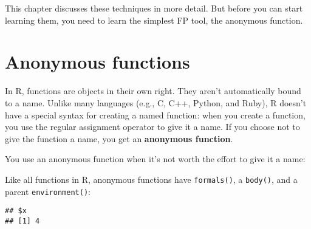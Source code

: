 This chapter discusses these techniques in more detail. But before you
can start learning them, you need to learn the simplest FP tool, the
anonymous function.

\hypertarget{anonymous-functions}{%
\section{Anonymous functions}\label{anonymous-functions}}

In R, functions are objects in their own right. They aren't
automatically bound to a name. Unlike many languages (e.g., C, C++,
Python, and Ruby), R doesn't have a special syntax for creating a named
function: when you create a function, you use the regular assignment
operator to give it a name. If you choose not to give the function a
name, you get an \textbf{anonymous function}.
 

You use an anonymous function when it's not worth the effort to give it
a name:

\begin{Shaded}
\begin{Highlighting}[]
\NormalTok{(}
\NormalTok{(}\OperatorTok{!}
\NormalTok{(}\OperatorTok{^}\StringTok{ }\NormalTok{, }
\end{Highlighting}
\end{Shaded}

Like all functions in R, anonymous functions have \texttt{formals()}, a
\texttt{body()}, and a parent \texttt{environment()}:

\begin{Shaded}
\begin{Highlighting}[]
\NormalTok{(}\NormalTok{(} \NormalTok{) }\OperatorTok{+}\StringTok{ }
\end{Highlighting}
\end{Shaded}

\begin{verbatim}
## $x
## [1] 4
\end{verbatim}

